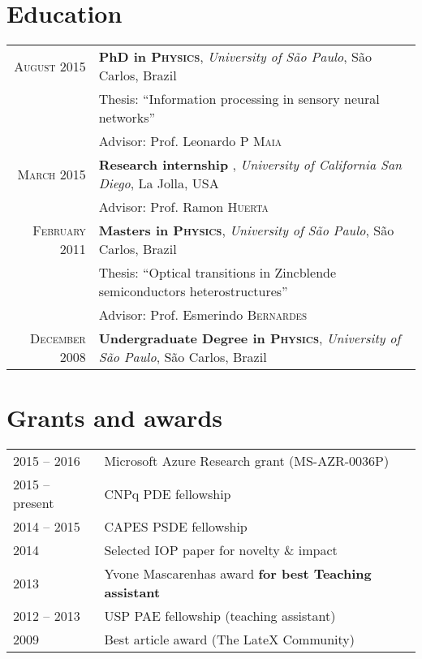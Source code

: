 \documentclass[letter,10pt]{article} %
\begin{document}
\section{Education}

\begin{tabular}{rp{12cm}}
  \textsc{August} 2015 & {\bf PhD in \textsc{Physics}}, \textit{University of S\~ao Paulo}, S\~ao Carlos, Brazil\\
  & Thesis: ``Information processing in sensory neural networks'' \\
  & \small Advisor: Prof. Leonardo P \textsc{Maia} \\

  \textsc{March} 2015 & {\bf Research internship }, \textit{University of California San Diego}, La Jolla, USA\\
  & \small Advisor: Prof. Ramon \textsc{Huerta} \\

  \textsc{February} 2011 & {\bf Masters in \textsc{Physics}}, \textit{University of S\~ao Paulo}, S\~ao Carlos, Brazil\\
  & Thesis: ``Optical transitions in Zincblende semiconductors heterostructures'' \\
  & \small Advisor: Prof. Esmerindo \textsc{Bernardes} \\

  \textsc{December} 2008 & {\bf Undergraduate Degree in \textsc{}\textsc{Physics}},
  \textit{University of S\~ao Paulo}, S\~ao Carlos, Brazil \\
\end{tabular}

\section{Grants and awards}

\renewcommand*{\arraystretch}{1.2}

\begin{longtable}{p{2.5cm}p{15cm}}
  2015 -- 2016  & Microsoft Azure Research grant (MS-AZR-0036P) \\
  2015 -- present  & CNPq PDE fellowship \\
  2014 -- 2015   & CAPES PSDE fellowship \\
  2014   & Selected IOP paper for novelty \& impact \\
  2013   & Yvone Mascarenhas award {\bf for best Teaching assistant} \\
  2012 -- 2013 & USP PAE fellowship (teaching assistant) \\
  2009   & Best article award (The LateX Community)
\end{longtable}
\end{document}
